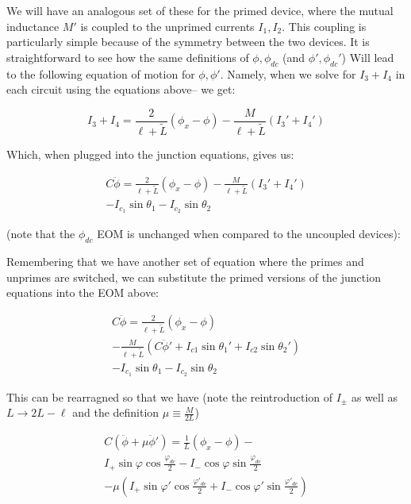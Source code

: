 \documentclass[paper=a4, twocolumn, fontsize=10pt]{article} %
\numberwithin{equation}{section} %
\numberwithin{figure}{section} %
\numberwithin{table}{section} %
\begin{document}
We will have an analogous set of these for the primed device, where the mutual inductance $M'$ is coupled to the unprimed currents $I_1, I_2$. This coupling is particularly simple because of the symmetry between the two devices. It is straightforward to see how the same definitions of $\phi,\phi_{dc}$ (and $\phi',\phi_{dc}'$) Will lead to the following equation of motion for $\phi,\phi'$. Namely, when we solve for $I_3+I_4$ in each circuit using the equations above-- we get:

\[ I_3 + I_4 = \frac{2}{\ell+\tilde{L}}\left(\phi_x - \phi \right) - \frac{M}{\ell+\tilde{L}} (I_3'+I_4') \]

Which, when plugged into the junction equations, gives us:

\begin{multline}
    C \ddot{\phi} = \frac{2}{\ell+\tilde{L}}\left( \phi_x - \phi \right) - \frac{M}{\ell+\tilde{L}} (I_3'+I_4') \\ - I_{c_1} \sin \theta_1 - I_{c_2} \sin \theta_2
\end{multline}

(note that the $\phi_{dc}$ EOM is unchanged when compared to the uncoupled devices):

Remembering that we have another set of equation where the primes and unprimes are switched, we can substitute the primed versions of the junction equations into the EOM above:

\begin{multline}
    C \ddot{\phi} = \frac{2}{\ell+\tilde{L}}\left( \phi_x - \phi \right) \\ - \frac{M}{\ell+\tilde{L}} ( C\ddot{\phi}' + I_{c1}\sin \theta_1' + I_{c2} \sin \theta_2') \\ - I_{c_1} \sin \theta_1 - I_{c_2} \sin \theta_2
\end{multline}

This can be rearragned so that we have (note the reintroduction of $I_{\pm}$ as well as $L\to 2L-\ell$ and the definition $\mu\equiv \frac{M}{2L}$)

\begin{multline}
    C \left(\ddot{\phi}+ \mu \ddot{\phi}' \right) = \frac{1}{L}\left( \phi_x - \phi \right) -  \\
    I_{+} \sin \varphi \cos \frac{\varphi_{dc}}{2} - I_{-} \cos \varphi \sin \frac{\varphi_{dc}}{2} \\
    - \mu ( I_{+} \sin \varphi' \cos \frac{\varphi'_{dc}}{2} + I_{-} \cos \varphi' \sin \frac{\varphi'_{dc}}{2})
\end{multline}
\end{document}
